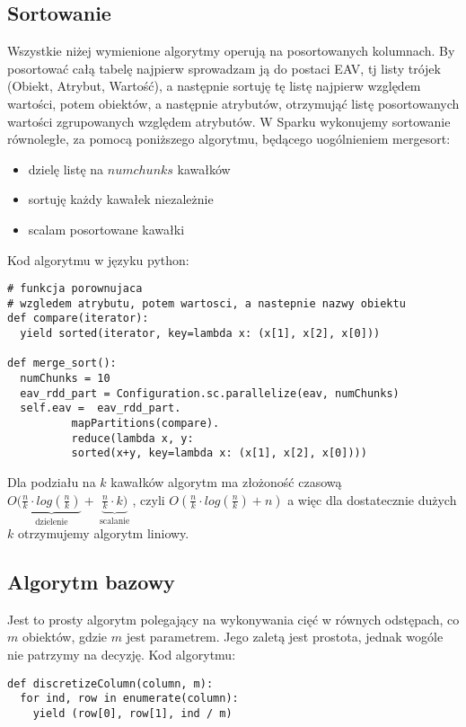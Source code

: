 \documentclass[magisterska]{pracamgr}
\theoremstyle{plain}
\theoremstyle{definition}
\theoremstyle{remark}
\begin{document}
\subsection{Sortowanie}
Wszystkie niżej wymienione algorytmy operują na posortowanych kolumnach. By posortować całą tabelę najpierw
sprowadzam ją do postaci EAV, tj listy trójek (Obiekt, Atrybut, Wartość), a następnie sortuję tę listę 
najpierw względem wartości, potem obiektów, a następnie atrybutów, otrzymująć listę posortowanych wartości
zgrupowanych względem atrybutów. W Sparku wykonujemy sortowanie równoległe, za pomocą poniższego algorytmu,
będącego uogólnieniem mergesort:
\begin{itemize}
 \item dzielę listę na $numchunks$ kawałków
 \item sortuję każdy kawałek niezależnie
 \item scalam posortowane kawałki
\end{itemize}
Kod algorytmu w języku python:
\begin{lstlisting}
# funkcja porownujaca
# wzgledem atrybutu, potem wartosci, a nastepnie nazwy obiektu
def compare(iterator):
  yield sorted(iterator, key=lambda x: (x[1], x[2], x[0]))

def merge_sort():
  numChunks = 10
  eav_rdd_part = Configuration.sc.parallelize(eav, numChunks)
  self.eav =  eav_rdd_part.
	      mapPartitions(compare).
	      reduce(lambda x, y: 
	      sorted(x+y, key=lambda x: (x[1], x[2], x[0])))
\end{lstlisting}

Dla podziału na $k$ kawałków algorytm ma złożoność czasową 
$O(\underbrace{\frac{n}{k} \cdot log(\frac{n}{k})}_{\text{ dzielenie }} + \underbrace{\frac{n}{k} \cdot k)}_{\text{ scalanie }}$,
	    czyli $O(\frac{n}{k} \cdot log(\frac{n}{k}) + n)$
a więc dla dostatecznie dużych $k$ otrzymujemy algorytm liniowy.
	      
	      

\subsection{Algorytm bazowy}
Jest to prosty algorytm polegający na wykonywania cięć w równych odstępach, co $m$ obiektów, gdzie
$m$ jest parametrem.
Jego zaletą jest prostota, jednak wogóle nie patrzymy na decyzję.
Kod algorytmu:
\begin{lstlisting} 
def discretizeColumn(column, m):
  for ind, row in enumerate(column):
    yield (row[0], row[1], ind / m)
\end{lstlisting}
\end{document}

